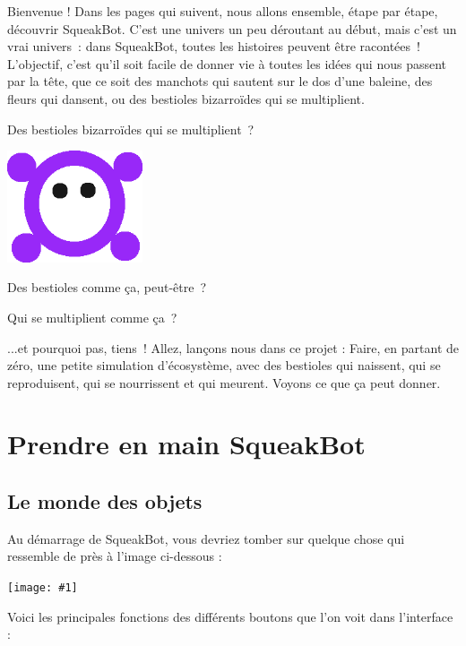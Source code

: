 \documentclass[a4paper,12pt]{book}
\def\appName{SqueakBot}
\newcommand{\capture}[1]
{
\begin{center}
	\texttt{[image: \#1]}
\end{center}
}
\begin{document}
Bienvenue ! Dans les pages qui suivent, nous allons ensemble, étape par étape, découvrir \appName. C'est une univers un peu déroutant au début, mais c'est un vrai univers~: dans \appName, toutes les histoires peuvent être racontées~! L'objectif, c'est qu'il soit facile de donner vie à toutes les idées qui nous passent par la tête, que ce soit des manchots qui sautent sur le dos d'une baleine, des fleurs qui dansent, ou des bestioles bizarroïdes qui se multiplient.

Des bestioles bizarroïdes qui se multiplient~?

\begin{center}
    \includegraphics[width=4cm]{bestiole.png}
\end{center}

Des bestioles comme ça, peut-être~?


Qui se multiplient comme ça~?

...et pourquoi pas, tiens~! Allez, lançons nous dans ce projet : Faire, en partant de zéro, une petite simulation d'écosystème, avec des bestioles qui naissent, qui se reproduisent, qui se nourrissent et qui meurent. Voyons ce que ça peut donner.

\chapter{Prendre en main \appName}

\section{Le monde des objets}

Au démarrage de \appName, vous devriez tomber sur quelque chose qui ressemble de près à l'image ci-dessous :

\capture{0.png}

Voici les principales fonctions des différents boutons que l'on voit dans l'interface :
\end{document}
